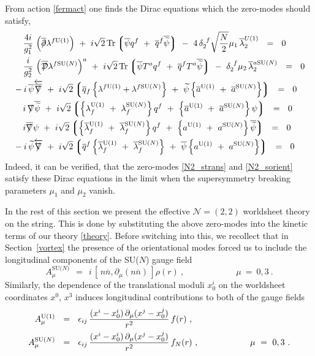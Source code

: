 \documentclass[12pt]{article}
\def\beq{\begin{equation}}
\def\eeq{\end{equation}}
\def\Tr{{\rm Tr}}
\newcommand{\ntwot}{${\mathcal N}= \left(2,2\right) $ }
\newcommand{\p}{\partial}
\newcommand{\wt}{\widetilde}
\newcommand{\ov}{\overline}
\newcommand{\md}{\mathcal{D}}
\newcommand{\lgr}{\left\lgroup}
\newcommand{\rgr}{\right\rgroup}
\def\slashed#1{\setbox0=\hbox{$#1$}             %
   \dimen0=\wd0                                 %
   \setbox1=\hbox{/} \dimen1=\wd1               %
   \ifdim\dimen0>\dimen1                        %
      \rlap{\hbox to \dimen0{\hfil/\hfil}}      %
      #1                                        %
   \else                                        %
      \rlap{\hbox to \dimen1{\hfil$#1$\hfil}}   %
      /                                         %
   \fi}                                        %
\newcommand{\aU}{a^{\rm U(1)}}
\newcommand{\aN}{a^\text{SU($N$)}}
\newcommand{\baU}{\ov{a}{}^{\rm U(1)}}
\newcommand{\baN}{\ov{a}{}^\text{SU($N$)}}
\newcommand{\nbar}{\ov{n}}
\begin{document}
	From action \eqref{fermact} one finds the Dirac equations which the zero-modes should satisfy,
\begin{align}
%
\notag
	&\phantom{-i}
	\frac{4i}{g_1^2}\, \left( \ov{\slashed{\p}}\lambda^{f {\rm U(1)}} \right) 
		~+~  i \sqrt{2}\, \Tr\lgr \ov{\psi} q^f  ~+~ \ov{q}{}^f \ov{\wt{\psi}} \rgr
		~-~ 4\, \delta_2^{\ f}\sqrt{\frac{N}{2}} \mu_1\, \ov{\lambda}^{U(1)}_2  ~~=~~ 0 \\
%
\notag
	&\phantom{-i}
	\frac{i}{g_2^2}\, \left( \ov{\slashed{\md}}\lambda^{f \text{SU($N$)}}\right)^a 
		~+~ i \sqrt{2}\, \Tr\lgr \ov{\psi}T^a q^f  ~+~  \ov{q}{}^f T^a \ov{\wt{\psi}} \rgr
		~-~ \delta_2^{\ f} \mu_2\, \ov{\lambda}{}_2^{a \text{SU($N$)}}  ~~=~~ 0 \\
%
\notag
	&
	-i\, \ov{\psi} \overleftarrow{\ov{\slashed{\nabla}}}
		~+~ i \sqrt{2} \lgr \ov{q}{}_f \left\{ \lambda^{f {\rm U(1)}} + \lambda^{f \text{SU($N$)}} \right\}
					~+~ \wt{\psi} \left\{ \baU  ~+~ \baN \right\} \rgr    ~~=~~ 0 \\
%
\label{dirac}
	&\phantom{-i}
	i\, \slashed{\nabla} \ov{\wt{\psi}} 
		~+~ i \sqrt{2} \lgr \left\{ \lambda_f^{\rm U(1)} ~+~ \lambda_f^\text{SU($N$)} \right\} q^f
					~+~ \left\{ \baU ~+~ \baN \right\}\psi \rgr  ~~=~~ 0 \\
%
\notag
	&\phantom{-i}
	i \ov{\slashed{\nabla}}\psi 
		~+~ i \sqrt{2} \lgr \left\{ \ov{\lambda}{}^{\rm U(1)}_f ~+~ \ov{\lambda}{}^\text{SU($N$)}_f \right\} q^f
					~+~ \left\{ \aU ~+~ \aN \right\} \ov{\wt{\psi}} \rgr   ~~=~~ 0 \\
%
\notag
	&
	-i\, \wt{\psi} \overleftarrow{\slashed{\nabla}}
		~+~ i \sqrt{2} \lgr \ov{q}{}^f \left\{ \ov{\lambda}{}_f^{\rm U(1)} ~+~ \ov{\lambda}{}_f^\text{SU($N$)} \right\}
					~+~ \ov{\psi} \left\{ \aU ~+~ \aN \right\} \rgr  ~~=~~ 0
\end{align}
	Indeed, it can be verified, that the zero-modes \eqref{N2_strans} and \eqref{N2_sorient} satisfy these
	Dirac equations in the limit when the supersymmetry breaking parameters $ \mu_1 $ and $ \mu_2 $ vanish.

	In the rest of this section we present the effective \ntwot worldsheet theory on the string.
	This is done by substituting the above zero-modes into the kinetic terms of our theory \eqref{theory}.
	Before switching into this, we recollect that in Section~\ref{vortex} the presence of the orientational modes
	forced us to include the longitudinal components of the SU($N$) gauge field
\beq
\label{Aorlong}
	A_\mu^\text{SU($N$)} ~~=~~ i\, \left[\, n\nbar, \p_\mu(n\nbar)\, \right] \rho(r)~,   \qquad\qquad\qquad \mu~=~0, 3~.
\eeq
	Similarly, the dependence of the translational moduli $ x_0^i $ on the worldsheet coordinates
	$ x^0 $, $ x^3 $ induces longitudinal contributions to both of the gauge fields
\begin{align}
%
\notag
	A_\mu^{\rm U(1)}	& ~~=~~ \epsilon_{ij}\,\frac{ (x^i - x_0^i)\,\p_\mu(x^j - x_0^j)} {r^2}\, f(r)~, \\
%
\label{Atrlong}
	A_\mu^\text{SU($N$)}	& ~~=~~ \epsilon_{ij}\,\frac{ (x^i - x_0^i)\,\p_\mu(x^j - x_0^j)} {r^2}\, f_N(r)~,
				\qquad\qquad\qquad \mu~=~0, 3~.
\end{align}
\end{document}
